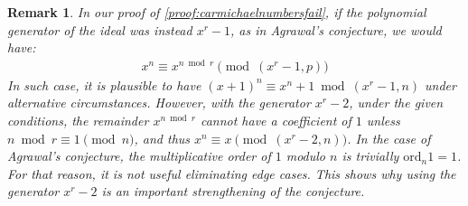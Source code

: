 \documentclass{article}
\theoremstyle{plain}
\newtheorem{remark}[theorem]{Remark}
\theoremstyle{definition}
\newcommand{\ord}{\mathrm{ord}}
\begin{document}
\begin{remark}
In our proof of \cref{proof:carmichaelnumbersfail}, if the polynomial generator of the ideal was instead $x^r-1$, as in Agrawal's conjecture, we would have:
\begin{align*}
    x^n \equiv x^{n \bmod r} \pmod{(x^r-1, p)}
\end{align*}
In such case, it is plausible to have $(x+1)^n \equiv x^n + 1 \bmod{(x^r-1, n)}$ under alternative circumstances. However, with the generator $x^r-2$, under the given conditions, the remainder $x^{n \bmod r}$ cannot have a coefficient of $1$ unless $n \bmod r \equiv 1 \pmod{n}$, and thus $x^n \equiv x \pmod{(x^r-2,n)}$. In the case of Agrawal's conjecture, the multiplicative order of $1$ modulo $n$ is trivially $\ord_n 1 = 1$. For that reason, it is not useful eliminating edge cases. This shows why using the generator $x^r-2$ is an important strengthening of the conjecture.
\end{remark}
\end{document}
